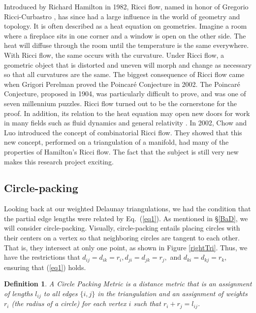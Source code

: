 \documentclass[12pt]{article}
\newtheorem{definition}[theorem]{Definition}
\begin{document}
Introduced by Richard Hamilton in 1982, Ricci flow, named in honor of Gregorio Ricci-Curbastro \cite{RicciBkgd}, has since had a large influence in the world of geometry and topology. It is often described as a heat equation on geometries. Imagine a room where a fireplace sits in one corner and a window is open on the other side. The heat will diffuse through the room until the temperature is the same everywhere. With Ricci flow, the same occurs with the curvature. Under Ricci flow, a geometric object that is distorted and uneven will morph and change as necessary so that all curvatures are the same. The biggest consequence of Ricci flow came when Grigori Perelman proved the Poincar\'{e} Conjecture in 2002. The Poincar\'{e} Conjecture, proposed in 1904, was particularly difficult to prove, and was one of seven millennium puzzles. Ricci flow turned out to be the cornerstone for the proof. In addition, its relation to the heat equation may open new doors for work in many fields such as fluid dynamics and general relativity \cite{RicciBkgd}. In 2002, Chow and Luo introduced the concept of combinatorial Ricci flow. They showed that this new concept, performed on a triangulation of a manifold, had many of the properties of Hamilton's Ricci flow. The fact that the subject is still very new makes this research project exciting. 

\subsection{Circle-packing}

 Looking back at our weighted Delaunay triangulations, we had the condition that the partial edge lengths were related by Eq.~(\ref{eq1}). As mentioned in \S\ref{BaD}, we will consider circle-packing. Visually, circle-packing entails placing circles with their centers on a vertex so that neighboring circles are tangent to each other. That is, they intersect at only one point, as shown in Figure \ref{rightTri}. Thus, we have the restrictions that $d_{ij} = d_{ik} = r_i, d_{ji} = d_{jk} = r_j,$ and $d_{ki} = d_{kj} = r_k$, ensuring that (\ref{eq1}) holds.

\begin{definition}
A Circle Packing Metric is a distance metric that is an assignment of lengths $l_{ij}$ to all edges $\{i, j\}$ in the triangulation and an assignment of weights $r_i$ (the radius of a circle) for each vertex $i$ such that $r_i + r_j = l_{ij}$. 
\end{definition}
\end{document}
